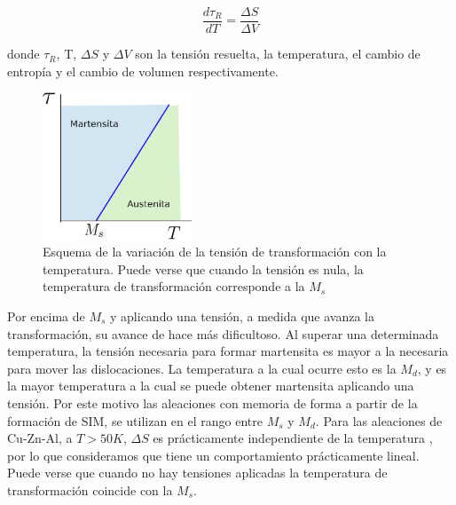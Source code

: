 \documentclass[a4paper,12pt,fleqn,twoside,openany]{book}
\begin{document}
\begin{equation}
 \frac{d \tau_{R}}{dT}=\frac{\Delta S}{\Delta V} 
\end{equation}

donde $\tau_{R}$, T, $\Delta S$ y $\Delta V$ son la tensión resuelta, la temperatura, el cambio de entropía y el cambio de volumen respectivamente.






\begin{figure}[h]
 \centering
 \includegraphics[width=0.4\textwidth]{Img/Introduccion/Clapeyron.eps}
 \caption{Esquema de la variación de la tensión de transformación con la temperatura. Puede verse que cuando la tensión es nula, la temperatura de
 transformación corresponde a la $M_s$}
\end{figure}






Por encima de $M_s$ y aplicando una tensión, a medida que avanza la transformación, su avance de hace más dificultoso. Al superar una determinada temperatura, la tensión necesaria para 
formar martensita es mayor a la necesaria para mover las dislocaciones. La temperatura a la cual ocurre esto es la $M_d$, y es la mayor temperatura a la cual se puede 
obtener martensita aplicando una tensión. Por este motivo las aleaciones con memoria de forma a partir de la formación de SIM, se utilizan en el rango entre $M_s$ y $M_d$.
Para las aleaciones de Cu-Zn-Al, a $T > 50K$, $\Delta S$ es prácticamente independiente de la temperatura \cite{pierre}, por lo que consideramos que tiene un comportamiento 
prácticamente lineal. Puede verse que cuando no hay tensiones aplicadas la temperatura de transformación coincide con la $M_s$.
\end{document}
